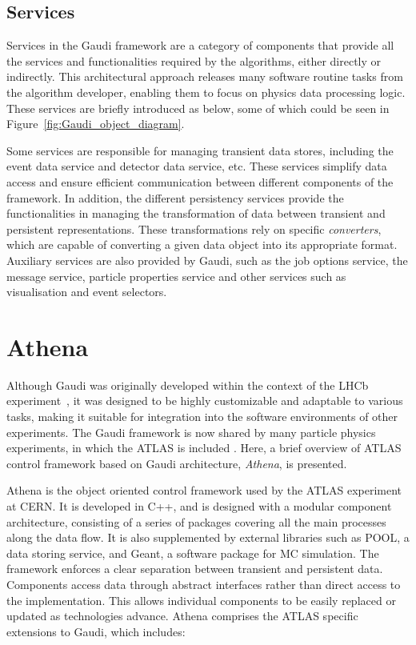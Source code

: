 \subsection{Services}
Services in the Gaudi framework are a category of components that provide all the services and functionalities required by the algorithms, either directly or indirectly. This architectural approach releases many software routine tasks from the algorithm developer, enabling them to focus on physics data processing logic. These services are briefly introduced as below, some of which could be seen in Figure~\ref{fig:Gaudi_object_diagram}.

Some services are responsible for managing transient data stores, including the event data service and detector data service, etc. These services simplify data access and ensure efficient communication between different components of the framework. In addition, the different persistency services provide the functionalities in managing the transformation of data between transient and persistent representations. These transformations rely on specific \textit{converters}, which are capable of converting a given data object into its appropriate format. Auxiliary services are also provided by Gaudi, such as the job options service, the message service, particle properties service and other services such as visualisation and event selectors.

\section{Athena}
Although Gaudi was originally developed within the context of the LHCb experiment~\cite{LHCb_tech}, it was designed to be highly customizable and adaptable to various tasks, making it suitable for integration into the software environments of other experiments. The Gaudi framework is now shared by many particle physics experiments, in which the ATLAS is included \cite{CHEP2004}. Here, a brief overview of ATLAS control framework based on Gaudi architecture, \textit{Athena}, is presented.

Athena is the object oriented control framework used by the ATLAS experiment at CERN. It is developed in C++, and is designed with a modular component architecture, consisting of a series of packages covering all the main processes along the data flow. It is also supplemented by external libraries such as POOL, a data storing service, and Geant, a software package for MC simulation.
The framework enforces a clear separation between transient and persistent data. Components access data through abstract interfaces rather than direct access to the implementation. This allows individual components to be easily replaced or updated as technologies advance. Athena comprises the ATLAS specific extensions to Gaudi, which includes:

